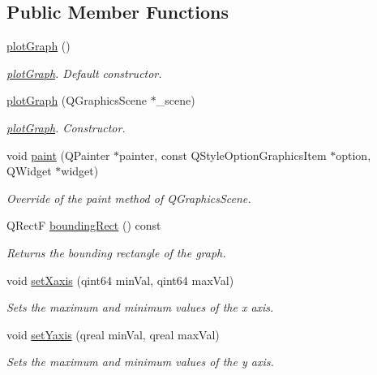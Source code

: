 \subsection*{Public Member Functions}
\begin{DoxyCompactItemize}
\item 
\hyperlink{classplot_graph_a53902ce2d9f08bfda697a887061b12ca}{plot\-Graph} ()
\begin{DoxyCompactList}\small\item\em \hyperlink{classplot_graph}{plot\-Graph}. Default constructor. \end{DoxyCompactList}\item 
\hyperlink{classplot_graph_ad42c2f82cf414d72aec713f03e1cba0e}{plot\-Graph} (Q\-Graphics\-Scene $\ast$\-\_\-scene)
\begin{DoxyCompactList}\small\item\em \hyperlink{classplot_graph}{plot\-Graph}. Constructor. \end{DoxyCompactList}\item 
void \hyperlink{classplot_graph_aa72b60c4f95834599921874fab85d01b}{paint} (Q\-Painter $\ast$painter, const Q\-Style\-Option\-Graphics\-Item $\ast$option, Q\-Widget $\ast$widget)
\begin{DoxyCompactList}\small\item\em Override of the paint method of Q\-Graphics\-Scene. \end{DoxyCompactList}\item 
Q\-Rect\-F \hyperlink{classplot_graph_a65061b6dda44811830977d80f46ed15e}{bounding\-Rect} () const 
\begin{DoxyCompactList}\small\item\em Returns the bounding rectangle of the graph. \end{DoxyCompactList}\item 
void \hyperlink{classplot_graph_a860f6e766de63d3a7a251f528dcc4be7}{set\-Xaxis} (qint64 min\-Val, qint64 max\-Val)
\begin{DoxyCompactList}\small\item\em Sets the maximum and minimum values of the x axis. \end{DoxyCompactList}\item 
void \hyperlink{classplot_graph_a0e2e3589bfc5cc726e367bf8bdc8a2f5}{set\-Yaxis} (qreal min\-Val, qreal max\-Val)
\begin{DoxyCompactList}\small\item\em Sets the maximum and minimum values of the y axis. \end{DoxyCompactList}\item 

\end{DoxyCompactItemize}
